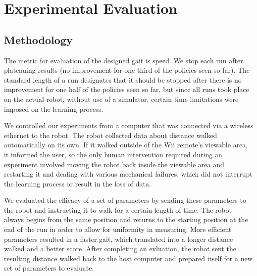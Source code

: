 \section{Experimental Evaluation}

\subsection{Methodology}

The metric for evaluation of the designed gait is speed. We stop each 
run after plateauing results (no improvement for one third of the 
policies seen so far). The standard length of a run designates that it
should be stopped after there is no improvement for one half of the policies
seen so far, but since all runs took place on the actual robot, without use
of a simulator, certain time limitations were imposed on the learning process.

We controlled our experiments from a computer that was connected via a 
wireless ethernet to the robot. The robot collected data about distance
walked automatically on its own. If it walked outside of the Wii remote's
viewable area, it informed the user, so the only human intervention
required during an experiment involved moving the robot back inside the 
viewable area and restarting it and dealing with various mechanical failures,
which did not interrupt the learning process or result in the loss of data.

We evaluated the efficacy of a set of parameters by sending these
parameters to the robot and instructing it to walk for a certain length
of time. The robot always begins from the same position and returns to the
starting position at the end of the run in order to allow for uniformity
in measuring. More efficient parameters resulted in a faster gait, which
translated into a longer distance walked and a better score. After completing
an evluation, the robot sent the resulting distance walked back to the
host computer and prepared itself for a new set of parameters to evaluate.

